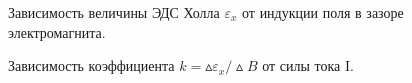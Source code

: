 \documentclass[a4paper,12pt]{article} %
\begin{document}
\newpage

\begin{figure}[H]\label{gr2}
 	\caption{Зависимость величины ЭДС Холла $\varepsilon_x$ от индукции поля в зазоре электромагнита.}
\end{figure}

\begin{figure}[H]\label{gr3}
 	\caption{Зависимость коэффициента $k = \vartriangle \varepsilon_x / \vartriangle B$ от силы тока I.}
\end{figure}
\end{document}

